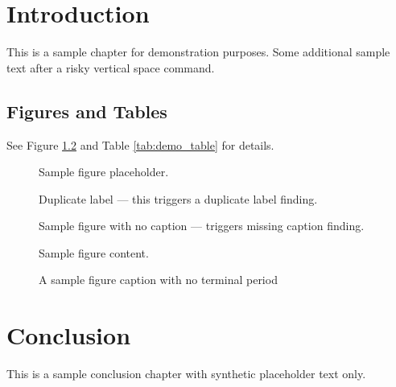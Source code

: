 \documentclass[12pt]{report}
\begin{document}
\doublespacing

\chapter{Introduction}
This is a sample chapter for demonstration purposes.
\vspace{1cm}
Some additional sample text after a risky vertical space command.

\section{Figures and Tables}
See Figure \ref{fig:demo_label} and Table \ref{tab:demo_table} for details.

\begin{figure}
\label{fig:demo_label}
Sample figure placeholder.
\end{figure}

\begin{figure}
\label{fig:demo_label}
Duplicate label — this triggers a duplicate label finding.
\end{figure}

\begin{figure}
Sample figure with no caption — triggers missing caption finding.
\end{figure}

\begin{figure}
\caption{A sample figure caption with no terminal period}
\label{fig:demo_caption}
Sample figure content.
\end{figure}

\chapter{Conclusion}
This is a sample conclusion chapter with synthetic placeholder text only.
\end{document}
